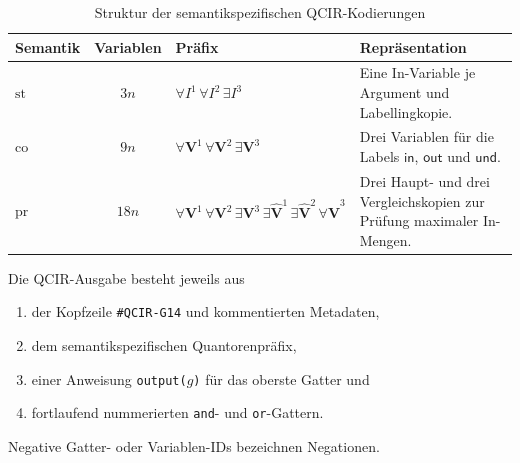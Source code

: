 \begin{table}[htb]
    \centering
    \begin{tabularx}{\textwidth}{@{}lclX@{}}
        \toprule
        Semantik & Variablen & Präfix & Repräsentation\\
        \midrule
        \(\mathrm{st}\)
            & \(3n\)
            & \(\forall I^1\,\forall I^2\,\exists I^3\)
            & Eine In-Variable je Argument und Labellingkopie.\\
        \(\mathrm{co}\)
            & \(9n\)
            & \(\forall\mathbf V^1\,
               \forall\mathbf V^2\,
               \exists\mathbf V^3\)
            & Drei Variablen für die Labels
              \(\mathsf{in}\), \(\mathsf{out}\) und
              \(\mathsf{und}\).\\
        \(\mathrm{pr}\)
            & \(18n\)
            & \(\forall\mathbf V^1\,
               \forall\mathbf V^2\,
               \exists\mathbf V^3\,
               \exists\widehat{\mathbf V}^{1}\,
               \exists\widehat{\mathbf V}^{2}\,
               \forall\widehat{\mathbf V}^{3}\)
            & Drei Haupt- und drei Vergleichskopien zur Prüfung
              maximaler In-Mengen.\\
        \bottomrule
    \end{tabularx}
    \caption{Struktur der semantikspezifischen QCIR-Kodierungen}
    \label{tab:appendix-qbf-encodings}
\end{table}

Die QCIR-Ausgabe besteht jeweils aus
\begin{enumerate}
    \item der Kopfzeile \texttt{\#QCIR-G14} und kommentierten Metadaten,
    \item dem semantikspezifischen Quantorenpräfix,
    \item einer Anweisung \texttt{output(\(g\))} für das oberste Gatter
          und
    \item fortlaufend nummerierten \texttt{and}- und
          \texttt{or}-Gattern.
\end{enumerate}
Negative Gatter- oder Variablen-IDs bezeichnen Negationen.

